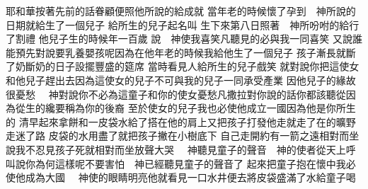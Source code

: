 \bchapter%
耶和華按著先前的話\chientien 眷顧\chientien 便照他所說的給成就\chuan 
{}當年老的時候\chientien{}懷了孕\yuentien 到　神所說的日期\chientien 就給生了一個兒子\chuan 
{}給所生的兒子起名叫\chuan 
{}生下來第八日\chientien{}照著　神所吩咐的\chientien 給行了割禮\chuan 
{}他兒子生的時候\chientien{}年一百歲\chuan 
{}說\chientien 　神使我喜笑\chientien 凡聽見的必與我一同喜笑\chuan 
{}又說\chientien 誰能預先對說\chientien{}要乳養嬰孩呢\chientien 因為在他年老的時候\chientien 我給他生了一個兒子\chuan\Chuan
{}孩子漸長\chientien 就斷了奶\yuentien{}斷奶的日子\chientien{}設擺豐盛的筵席\chuan 
{}當時\chientien{}看見人給所生的兒子戲笑\chientien 
{}就對說\chientien 你把這使女\chientien 和他兒子趕出去\chientien 因為這使女的兒子\chientien 不可與我的兒子\chientien 一同承受產業\chuan 
{}因他兒子的緣故很憂愁\chuan 
{}　神對說\chientien 你不必為這童子和你的使女憂愁\chientien 凡撒拉對你說的話\chientien 你都該聽從\yuentien 因為從生的\chientien 纔要稱為你的後裔\chuan 
{}至於使女的兒子\chientien 我也必使他成立一國\chientien 因為他是你所生的\chuan 
{}清早起來\chientien 拿餅和一皮袋水\chientien 給了\chientien 搭在他的肩上\chientien 又把孩子\chientien 打發他走\yuentien{}就走了\chientien 在的曠野走迷了路\chuan 
{}皮袋的水用盡了\chientien{}就把孩子撇在小樹底下\chientien 
{}自己走開約有一箭之遠\chientien 相對而坐\chientien 說\chientien 我不忍見孩子死\chientien 就相對而坐\chientien 放聲大哭\chuan 
{}　神聽見童子的聲音\yuentien 　神的使者從天上呼叫說\chientien{}\chientien 你為何這樣呢\chientien 不要害怕\chientien 　神已經聽見童子的聲音了\chuan 
{}起來\chientien 把童子抱在懷中\chientien{}我必使他成為大國\chuan 
{}　神使的眼睛明亮\chientien 他就看見一口水井\chientien 便去將皮袋盛滿了水\chientien 給童子喝\chuan 
